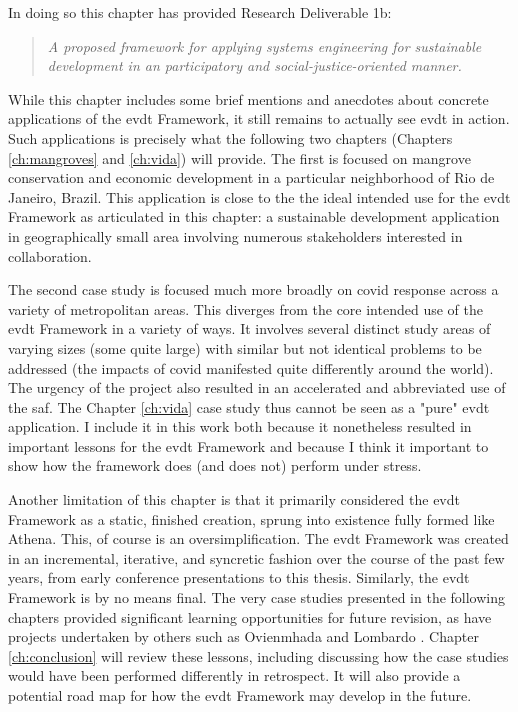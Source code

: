 In doing so this chapter has provided Research Deliverable 1b:

\blockquote{\textit{A proposed framework for applying systems engineering for sustainable development in an participatory and social-justice-oriented manner.}}

While this chapter includes some brief mentions and anecdotes about concrete applications of the \ac{evdt} Framework, it still remains to actually see \ac{evdt} in action. Such applications is precisely what the following two chapters (Chapters \ref{ch:mangroves} and \ref{ch:vida}) will provide. The first is focused on mangrove conservation and economic development in a particular neighborhood of Rio de Janeiro, Brazil. This application is close to the the ideal intended use for the \ac{evdt} Framework as articulated in this chapter: a sustainable development application in geographically small area involving numerous stakeholders interested in collaboration. 

The second case study is focused much more broadly on \ac{covid} response across a variety of metropolitan areas. This diverges from the core intended use of the \ac{evdt} Framework in a variety of ways. It involves several distinct study areas of varying sizes (some quite large) with similar but not identical problems to be addressed (the impacts of \ac{covid} manifested quite differently around the world). The urgency of the project also resulted in an accelerated and abbreviated use of the \ac{saf}. The Chapter \ref{ch:vida} case study thus cannot be seen as a "pure" \ac{evdt} application. I include it in this work both because it nonetheless resulted in important lessons for the \ac{evdt} Framework and because I think it important to show how the framework does (and does not) perform under stress.

Another limitation of this chapter is that it primarily considered the \ac{evdt} Framework as a static, finished creation, sprung into existence fully formed like Athena. This, of course is an oversimplification. The \ac{evdt} Framework was created in an incremental, iterative, and syncretic fashion over the course of the past few years, from early conference presentations \cite{reidCombiningSocialEnvironmental2019} to this thesis. Similarly, the \ac{evdt} Framework is by no means final. The very case studies presented in the following chapters provided significant learning opportunities for future revision, as have projects undertaken by others such as Ovienmhada \cite{ovienmhadaEnvironmentVulnerabilityDecisionTechnologyModelingFramework2021, ovienmhadaEarthObservationTechnology2020} and Lombardo \cite{lombardoEnvironmentVulnerabilityDecisionTechnologyFrameworkDecision2022}. Chapter \ref{ch:conclusion} will review these lessons, including discussing how the case studies would have been performed differently in retrospect. It will also provide a potential road map for how the \ac{evdt} Framework may develop in the future.
